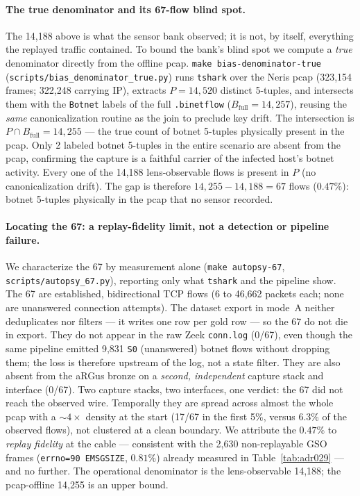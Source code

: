 \documentclass[11pt,a4paper]{article}
\begin{document}
    \paragraph{The true denominator and its 67-flow blind spot.}
    The 14{,}188 above is what the sensor bank observed; it is not, by itself, everything the
    replayed traffic contained. To bound the bank's blind spot we compute a \emph{true}
    denominator directly from the offline pcap. \texttt{make bias-denominator-true}
    (\texttt{scripts/bias\_denominator\_true.py}) runs \texttt{tshark} over the Neris pcap
    (323{,}154 frames; 322{,}248 carrying IP), extracts $P = 14{,}520$ distinct 5-tuples, and
    intersects them with the \texttt{Botnet} labels of the full \texttt{.binetflow}
    ($B_{\text{full}} = 14{,}257$), reusing the \emph{same} canonicalization routine as the
    join to preclude key drift. The intersection is $P \cap B_{\text{full}} = 14{,}255$ --- the
    true count of botnet 5-tuples physically present in the pcap. Only 2 labeled botnet
    5-tuples in the entire scenario are absent from the pcap, confirming the capture is a
    faithful carrier of the infected host's botnet activity. Every one of the 14{,}188
    lens-observable flows is present in $P$ (no canonicalization drift). The gap is therefore
    $14{,}255 - 14{,}188 = 67$ flows ($0.47\%$): botnet 5-tuples physically in the pcap that
    no sensor recorded.

    \paragraph{Locating the 67: a replay-fidelity limit, not a detection or pipeline failure.}
    We characterize the 67 by measurement alone (\texttt{make autopsy-67},
    \texttt{scripts/autopsy\_67.py}), reporting only what \texttt{tshark} and the pipeline show.
    The 67 are established, bidirectional TCP flows (6 to 46{,}662 packets each; none are
    unanswered connection attempts). The dataset export in mode~A neither deduplicates nor
    filters --- it writes one row per gold row --- so the 67 do not die in export. They do not
    appear in the raw Zeek \texttt{conn.log} (0/67), even though the same pipeline emitted
    9{,}831 \texttt{S0} (unanswered) botnet flows without dropping them; the loss is therefore
    upstream of the log, not a state filter. They are also absent from the aRGus bronze on a
    \emph{second, independent} capture stack and interface (0/67). Two capture stacks, two
    interfaces, one verdict: the 67 did not reach the observed wire. Temporally they are spread
    across almost the whole pcap with a ${\sim}4\times$ density at the start (17/67 in the first
    5\%, versus 6.3\% of the observed flows), not clustered at a clean boundary. We attribute
    the $0.47\%$ to \emph{replay fidelity} at the cable --- consistent with the 2{,}630
    non-replayable GSO frames (\texttt{errno=90~EMSGSIZE}, $0.81\%$) already measured in
    Table~\ref{tab:adr029} --- and no further. The operational denominator is the
    lens-observable 14{,}188; the pcap-offline 14{,}255 is an upper bound.
\end{document}
